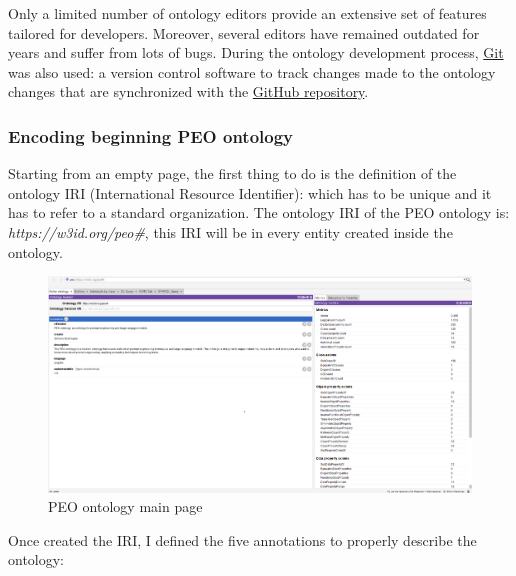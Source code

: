 Only a limited number of ontology editors provide an extensive set of features tailored for developers. Moreover, several editors have remained outdated for years and suffer from lots of bugs. During the ontology development process, \href{https://git-scm.com/}{Git} was also used: a version control software to track changes made to the ontology changes that are synchronized with the \href{https://github.com/simonegramegna/peo_ontology}{GitHub repository}.
\subsubsection{Encoding beginning PEO ontology}
Starting from an empty page, the first thing to do is the definition of the ontology IRI (International Resource Identifier): which has to be unique and it has to refer to a standard organization. The ontology IRI of the PEO ontology is: \textit{https://w3id.org/peo\#}, this IRI will be in every entity created inside the ontology.
\begin{figure}[H]
    \centering
    \includegraphics[width=1.0\linewidth]{Figures/fig_29.png}
    \caption{PEO ontology main page}
    \label{fig:enter-label}
\end{figure}
Once created the IRI, I defined the five annotations to properly describe the ontology:
